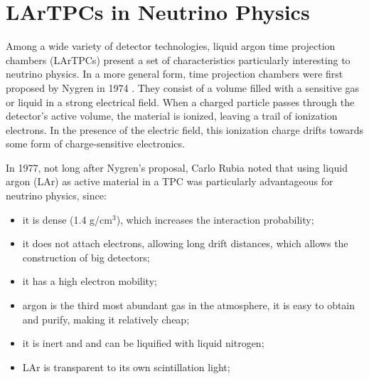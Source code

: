 \section{LArTPCs in Neutrino Physics}
Among a wide variety of detector technologies, liquid argon time projection chambers (LArTPCs) present a set of characteristics particularly interesting to neutrino physics. 
In a more general form, time projection chambers were first proposed by Nygren in 1974 \cite{Nygren}. They consist of a volume filled with a sensitive gas or liquid in a strong electrical field. When a charged particle passes through the detector's active volume, the material is ionized, leaving a trail of ionization electrons. In the presence of the electric field, this ionization charge drifts towards some form of charge-sensitive electronics.

In 1977, not long after Nygren's proposal, Carlo Rubia noted that using liquid argon (LAr) as active material in a TPC was particularly advantageous for neutrino physics, since:
\begin{itemize}
	\item it is dense (1.4 g/cm$^3$), which increases the interaction probability;
 	\item it does not attach electrons, allowing long drift distances, which allows the construction of big detectors;
  	\item it has a high electron mobility;
   	\item argon is the third most abundant gas in the atmosphere, it is easy to obtain and purify, making it relatively cheap;
  	\item it is inert and and can be liquified with liquid nitrogen; 
	\item LAr is transparent to its own scintillation light; \cite{Rubia_ANewConcept}
\end{itemize}

